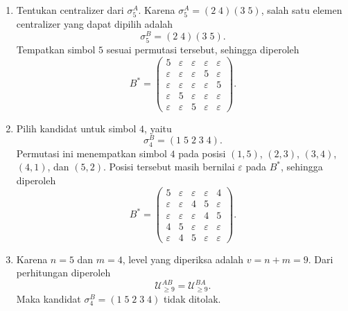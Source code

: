 \begin{contoh}
\begin{enumerate}
    \item Tentukan centralizer dari $\sigma_5^A$. Karena
          $\sigma_5^A=(2\;4)(3\;5)$, salah satu elemen centralizer yang dapat
          dipilih adalah
          \[
            \sigma_5^B=(2\;4)(3\;5).
          \]
          Tempatkan simbol $5$ sesuai permutasi tersebut, sehingga diperoleh
          \[
            B^*=
            \begin{pmatrix}
              5           & \varepsilon & \varepsilon & \varepsilon & \varepsilon \\
              \varepsilon & \varepsilon & \varepsilon & 5           & \varepsilon \\
              \varepsilon & \varepsilon & \varepsilon & \varepsilon & 5           \\
              \varepsilon & 5           & \varepsilon & \varepsilon & \varepsilon \\
              \varepsilon & \varepsilon & 5           & \varepsilon & \varepsilon
            \end{pmatrix}.
          \]

    \item Pilih kandidat untuk simbol $4$, yaitu
          \[
            \sigma_4^B=(1\;5\;2\;3\;4).
          \]
          Permutasi ini menempatkan simbol $4$ pada posisi
          $(1,5)$, $(2,3)$, $(3,4)$, $(4,1)$, dan $(5,2)$.
          Posisi tersebut masih bernilai $\varepsilon$ pada $B^*$, sehingga
          diperoleh
          \[
            B^*=
            \begin{pmatrix}
              5           & \varepsilon & \varepsilon & \varepsilon & 4           \\
              \varepsilon & \varepsilon & 4           & 5           & \varepsilon \\
              \varepsilon & \varepsilon & \varepsilon & 4           & 5           \\
              4           & 5           & \varepsilon & \varepsilon & \varepsilon \\
              \varepsilon & 4           & 5           & \varepsilon & \varepsilon
            \end{pmatrix}.
          \]

    \item Karena $n=5$ dan $m=4$, level yang diperiksa adalah $v=n+m=9$.
          Dari perhitungan diperoleh
          \[
            \mathcal{U}_{\ge 9}^{AB}
            =
            \mathcal{U}_{\ge 9}^{BA}.
          \]
          Maka kandidat $\sigma_4^B=(1\;5\;2\;3\;4)$ tidak ditolak.


\end{enumerate}
\end{contoh}
